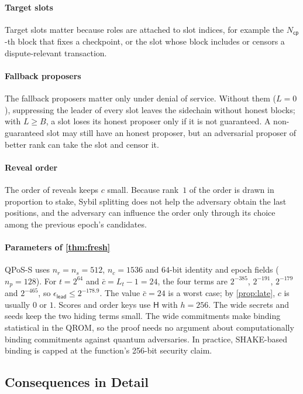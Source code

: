 \documentclass[10pt,journal,compsoc]{IEEEtran}
\theoremstyle{tplain}
\theoremstyle{tdef}
\theoremstyle{remark}
\newcommand{\Hash}{\mathsf{H}}
\begin{document}
\paragraph{Target slots} Target slots matter because roles are attached to slot indices, for example the $N_{\mathsf{cp}}$-th block that fixes a checkpoint, or the slot whose block includes or censors a dispute-relevant transaction.

\paragraph{Fallback proposers} The fallback proposers matter only under denial of service. Without them ($L=0$), suppressing the leader of every slot leaves the sidechain without honest blocks; with $L\ge B$, a slot loses its honest proposer only if it is not guaranteed. A non-guaranteed slot may still have an honest proposer, but an adversarial proposer of better rank can take the slot and censor it.

\paragraph{Reveal order} The order of reveals keeps $c$ small. Because rank~$1$ of the order is drawn in proportion to stake, Sybil splitting does not help the adversary obtain the last positions, and the adversary can influence the order only through its choice among the previous epoch's candidates.

\paragraph{Parameters of \cref{thm:fresh}} QPoS-S uses $n_r=n_s=512$, $n_c=1536$ and $64$-bit identity and epoch fields ($n_p=128$). For $t=2^{64}$ and $\bar c=L_t-1=24$, the four terms are $2^{-385}$, $2^{-191}$, $2^{-179}$ and $2^{-465}$, so $\epsilon_{\mathsf{lead}}\le 2^{-178.9}$. The value $\bar c=24$ is a worst case; by \cref{prop:late}, $c$ is usually $0$ or $1$. Scores and order keys use $\Hash$ with $h=256$. The wide secrets and seeds keep the two hiding terms small. The wide commitments make binding statistical in the QROM, so the proof needs no argument about computationally binding commitments against quantum adversaries. In practice, SHAKE-based binding is capped at the function's 256-bit security claim.


\subsection{Consequences in Detail}\label{S-cons-consequences}
\end{document}
